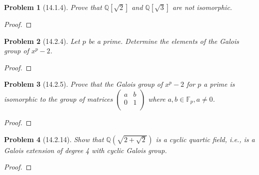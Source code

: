 \documentclass[10pt]{article}
\newcommand{\sk}{\vskip 10mm}
\newcommand{\bb}[1]{\mathbb{#1}}
\theoremstyle{plain}
\newtheorem{problem}{Problem}
\theoremstyle{remark}
\begin{document}
\begin{problem}[14.1.4]
  Prove that $\bb{Q}[\sqrt{2}]$ and $\bb{Q}[\sqrt{3}]$ are not isomorphic.
\end{problem}

\begin{proof}
  
\end{proof}

\sk

\begin{problem}[14.2.4]
  Let $p$ be a prime. Determine the elements of the Galois group of $x^p-2$.
\end{problem}

\begin{proof}
  
\end{proof}

\sk

\begin{problem}[14.2.5]
  Prove that the Galois group of $x^p-2$ for $p$ a prime is isomorphic to
  the group of matrices $\left(\begin{array}{cc}a&b\\0&1\\ \end{array}\right)$
  where $a,b\in\bb{F}_p,a\neq 0$.
\end{problem}

\begin{proof}
  
\end{proof}

\sk

\begin{problem}[14.2.14]
  Show that $\bb{Q}(\sqrt{2+\sqrt{2}})$ is a cyclic quartic field,
  i.e., is a Galois extension of degree 4 with cyclic Galois group.
\end{problem}

\begin{proof}
  
\end{proof}

\sk

\end{document}
